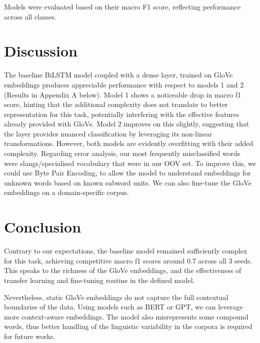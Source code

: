 \documentclass[11pt]{article}
\begin{document}
Models were evaluated based on their macro F1 score, reflecting performance across all classes.



\section{Discussion}
\label{sec:discussion}

The baseline BiLSTM model coupled with a dense layer, trained on GloVe embeddings produces appreciable performance with respect to models 1 and 2 (Results in Appendix A below). Model 1 shows a noticeable drop in macro f1 score, hinting that the additional complexity does not translate to better representation for this task, potentially interfering with the effective features already provided with GloVe. Model 2 improves on this slightly, suggesting that the layer provides nuanced classification by leveraging its non-linear transformations. However, both models are evidently overfitting with their added complexity.
\newline
Regarding error analysis, our most frequently misclassified words were slangs/specialised vocabulary that were in our OOV set. To improve this, we could use Byte Pair Encoding, to allow the model to understand embeddings for unknown words based on known subword units. We can also fine-tune the GloVe embeddings on a domain-specific corpus. 



\section{Conclusion}
\label{sec:conclusion}
Contrary to our expectations, the baseline model remained sufficiently complex for this task, achieving competitive macro f1 scores around 0.7 across all 3 seeds. This speaks to the richness of the GloVe embeddings, and the effectiveness of transfer learning and fine-tuning routine in the defined model.

Nevertheless, static GloVe embeddings do not capture the full contextual boundaries of the data. Using models such as BERT or GPT, we can leverage more context-aware embeddings. The model also misrepresents some compound words, thus better handling of the linguistic variability in the corpora is required for future works. 
\end{document}
